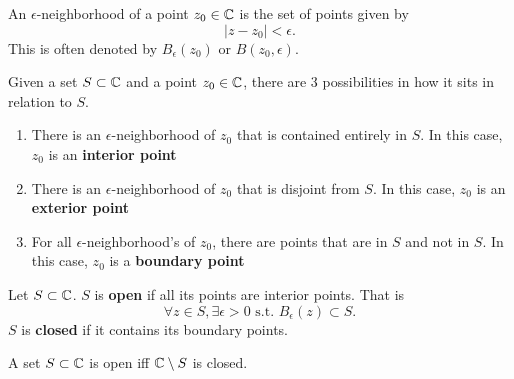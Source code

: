 \documentclass[../notes.tex]{subfiles}
\begin{document}

\begin{definition}
    An $\epsilon$-neighborhood of a point $z_0 \in \mathbb{C}$ is the set of points given by
    \[
        |z - z_0| < \epsilon
    .\]
    This is often denoted by $B_\epsilon (z_0)$ or $B(z_0, \epsilon)$.
\end{definition}

\begin{definition}
    Given a set $S \subset \mathbb{C}$ and a point $z_0 \in \mathbb{C}$, there are 3 possibilities in how it sits in relation to $S$.

    \begin{enumerate}
        \item There is an $\epsilon$-neighborhood of $z_0$ that is contained entirely in $S$. In this case, $z_0$ is an \textbf{interior point}
        \item There is an $\epsilon$-neighborhood of $z_0$ that is disjoint from $S$. In this case, $z_0$ is an \textbf{exterior point}
        \item For all $\epsilon$-neighborhood's of $z_0$, there are points that are in $S$ and not in $S$. In this case, $z_0$ is a \textbf{boundary point}
    \end{enumerate}
\end{definition}

\begin{definition}
    Let $S \subset \mathbb{C}$. $S$ is \textbf{open} if all its points are interior points. That is
    \[
        \forall z \in S, \exists \epsilon > 0 \text{ s.t. } B_\epsilon(z) \subset S
    .\]
    $S$ is \textbf{closed} if it contains its boundary points.
\end{definition}

\begin{theorem}
    A set $S \subset \mathbb{C}$ is open iff $\mathbb{C} \setminus S$ is closed.
\end{theorem}
\end{document}
